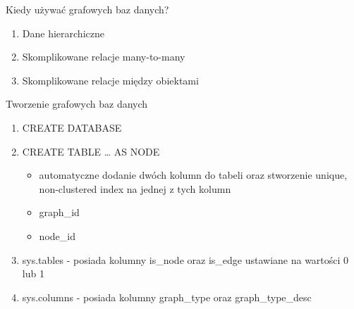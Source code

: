 \documentclass[a4paper]{article}
\begin{document}
    Kiedy używać grafowych baz danych?
    \begin{enumerate}
        \item Dane hierarchiczne
        \item Skomplikowane relacje many-to-many
        \item Skomplikowane relacje między obiektami
    \end{enumerate}


    Tworzenie grafowych baz danych
    \begin{enumerate}
        \item CREATE DATABASE
        \item CREATE TABLE … AS NODE
        \begin{itemize}
            \item automatyczne dodanie dwóch kolumn do tabeli oraz stworzenie unique, non-clustered index na jednej z tych kolumn
            \item graph\_id
            \item node\_id
        \end{itemize}
        \item sys.tables - posiada kolumny is\_node oraz is\_edge ustawiane na wartości 0 lub 1
        \item sys.columns - posiada kolumny graph\_type oraz graph\_type\_desc
    \end{enumerate}
\end{document}

